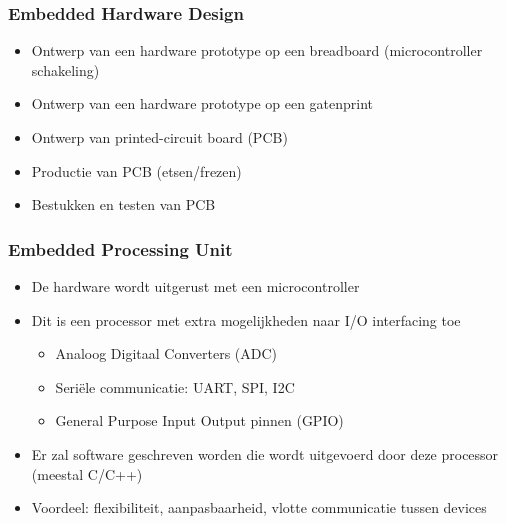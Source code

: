 \documentclass{beamer}
\begin{document}

\begin{frame} 
\frametitle{Embedded Hardware Design}

\begin{itemize}[<+->]
\item Ontwerp van een hardware prototype op een breadboard (microcontroller schakeling)
\item Ontwerp van een hardware prototype op een gatenprint
\item Ontwerp van printed-circuit board (PCB)
\item Productie van PCB (etsen/frezen)
\item Bestukken en testen van PCB
\end{itemize}


\end{frame}


\begin{frame} 
\frametitle{Embedded Processing Unit}
\begin{itemize}[<+->]
  \item De hardware wordt uitgerust met een microcontroller
  \item Dit is een processor met extra mogelijkheden naar I/O interfacing toe
    \begin{itemize}
    \item Analoog Digitaal Converters (ADC)
    \item Seri\"ele communicatie: UART, SPI, I2C
    \item General Purpose Input Output pinnen (GPIO)
    \end{itemize}
  \item Er zal software geschreven worden die wordt uitgevoerd door deze processor (meestal C/C++)
  \item Voordeel: flexibiliteit, aanpasbaarheid, vlotte communicatie tussen devices 
\end{itemize}
\end{frame}

\end{document}

